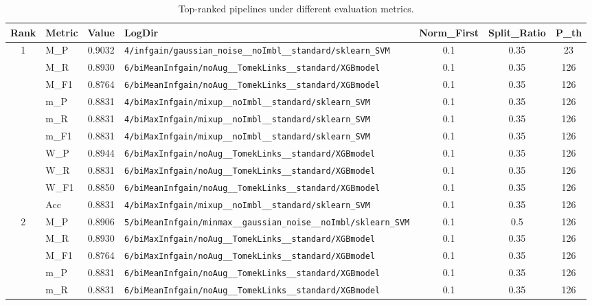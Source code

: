 \begin{table}[htbp]
\caption{Top-ranked pipelines under different evaluation metrics.}
\label{tab:rank_metric_vertical}
\centering
\small
\setlength{\tabcolsep}{4pt}
\begin{tabular}{|c|l|c|>{\ttfamily\footnotesize}p{7.2cm}|c|c|c|}
\hline
Rank & Metric & Value & LogDir & Norm\_First & Split\_Ratio & P\_th \\
\hline
\multirow{10}{*}{1} & M\_P & 0.9032 & \texttt{4/infgain/gaussian\_noise\_\_noImbl\_\_standard/sklearn\_SVM} & 0.1 & 0.35  & 23 \\ 
 & M\_R & 0.8930 & \texttt{6/biMeanInfgain/noAug\_\_TomekLinks\_\_standard/XGBmodel} & 0.1 & 0.35  & 126 \\ 
 & M\_F1 & 0.8764 & \texttt{6/biMeanInfgain/noAug\_\_TomekLinks\_\_standard/XGBmodel} & 0.1 & 0.35  & 126 \\ 
 & m\_P & 0.8831 & \texttt{4/biMaxInfgain/mixup\_\_noImbl\_\_standard/sklearn\_SVM} & 0.1 & 0.35  & 126 \\ 
 & m\_R & 0.8831 & \texttt{4/biMaxInfgain/mixup\_\_noImbl\_\_standard/sklearn\_SVM} & 0.1 & 0.35  & 126 \\ 
 & m\_F1 & 0.8831 & \texttt{4/biMaxInfgain/mixup\_\_noImbl\_\_standard/sklearn\_SVM} & 0.1 & 0.35  & 126 \\ 
 & W\_P & 0.8944 & \texttt{6/biMaxInfgain/noAug\_\_TomekLinks\_\_standard/XGBmodel} & 0.1 & 0.35  & 126 \\ 
 & W\_R & 0.8831 & \texttt{6/biMaxInfgain/noAug\_\_TomekLinks\_\_standard/XGBmodel} & 0.1 & 0.35  & 126 \\ 
 & W\_F1 & 0.8850 & \texttt{6/biMeanInfgain/noAug\_\_TomekLinks\_\_standard/XGBmodel} & 0.1 & 0.35  & 126 \\ 
 & Acc & 0.8831 & \texttt{4/biMaxInfgain/mixup\_\_noImbl\_\_standard/sklearn\_SVM} & 0.1 & 0.35  & 126 \\ 
\hline
\multirow{10}{*}{2} & M\_P & 0.8906 & \texttt{5/biMeanInfgain/minmax\_\_gaussian\_noise\_\_noImbl/sklearn\_SVM} & 0.1 & 0.5  & 126 \\ 
 & M\_R & 0.8930 & \texttt{6/biMaxInfgain/noAug\_\_TomekLinks\_\_standard/XGBmodel} & 0.1 & 0.35  & 126 \\ 
 & M\_F1 & 0.8764 & \texttt{6/biMaxInfgain/noAug\_\_TomekLinks\_\_standard/XGBmodel} & 0.1 & 0.35  & 126 \\ 
 & m\_P & 0.8831 & \texttt{6/biMeanInfgain/noAug\_\_TomekLinks\_\_standard/XGBmodel} & 0.1 & 0.35  & 126 \\ 
 & m\_R & 0.8831 & \texttt{6/biMeanInfgain/noAug\_\_TomekLinks\_\_standard/XGBmodel} & 0.1 & 0.35  & 126 \\ 

\end{tabular}
\end{table}
